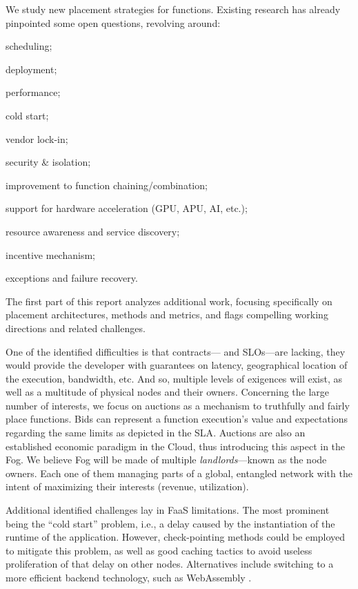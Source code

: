 We study new placement strategies for functions. Existing research \cite{kjorveziroski_iot_2021,xie_when_2021} has already pinpointed some open questions, revolving around:
\begin{enumerate*}[(1)]
	\item scheduling;
	\item deployment;
	\item performance;
	\item cold start;
	\item vendor lock-in;
	\item security \& isolation;
	\item improvement to function chaining/combination;
	\item support for hardware acceleration (\gls{GPU}, \gls{APU}, \gls{AI}, etc.);
	\item resource awareness and service discovery;
	\item incentive mechanism;
	\item exceptions and failure recovery.
\end{enumerate*}
The first part of this report analyzes additional work, focusing specifically on placement architectures, methods and metrics, and flags compelling working directions and related challenges.

One of the identified difficulties is that contracts— and \glspl{SLO}—are lacking, they would provide the developer with guarantees on latency, geographical location of the execution, bandwidth, etc. And so, multiple levels of exigences will exist, as well as a multitude of physical nodes and their owners. Concerning the large number of interests, we focus on auctions as a mechanism to truthfully and fairly place functions. Bids can represent a function execution’s value and expectations regarding the same limits as depicted in the \gls{SLA}. Auctions are also an established economic paradigm in the Cloud, thus introducing this aspect in the Fog. We believe Fog will be made of multiple \emph{landlords}—known as the node owners. Each one of them managing parts of a global, entangled network with the intent of maximizing their interests (revenue, utilization).

Additional identified challenges lay in \gls{FaaS} limitations. The most prominent being the “cold start” problem, i.e., a delay caused by the instantiation of the runtime of the application. However, check-pointing methods could be employed to mitigate this problem, as well as good caching tactics to avoid useless proliferation of that delay on other nodes. Alternatives include switching to a more efficient backend technology, such as WebAssembly \cite{hykes_solomon_2019}.

